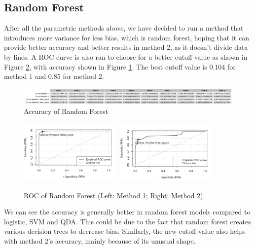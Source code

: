 \documentclass[11pt]{article}
\begin{document}
\subsection{Random Forest}

After all the parametric methods above, we have decided to run a method that introduces more variance for less bias, which is random forest, hoping that it can provide better accuracy and better results in method 2, as it doesn't divide data by lines. A ROC curve is also ran to choose for a better cutoff value as shown in Figure \ref{fig:3-4-2}, with accuracy shown in Figure \ref{fig:3-4-1}. The best cutoff value is 0.104 for method 1 and 0.85 for method 2.

\begin{figure}[h]
\includegraphics[width=\textwidth]{3-4-1.png}
\centering
\caption{Accuracy of Random Forest}
\label{fig:3-4-1}
\centering
\end{figure}

\begin{figure}[h]
\includegraphics[width=0.45\textwidth]{rf_1.jpeg}
\includegraphics[width=0.45\textwidth]{rf_2.jpeg}
\centering
\caption{ROC of Random Forest (Left: Method 1; Right: Method 2)}
\label{fig:3-4-2}
\centering
\end{figure}

We can see the accuracy is generally better in random forest models compared to logistic, SVM and QDA. This could be due to the fact that random forest creates various decision trees to decrease bias. Similarly, the new cutoff value also helps with method 2's accuracy, mainly because of its unusual shape.
\end{document}
